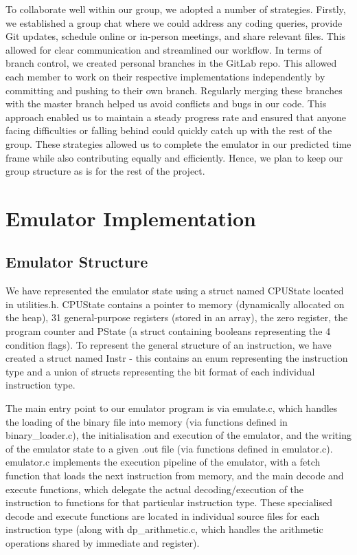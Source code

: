 \documentclass{article}
\begin{document}
To collaborate well within our group, we adopted a number of strategies.
Firstly, we established a group chat where we could address any coding queries,
provide Git updates, schedule online or in-person meetings, and share relevant
files. This allowed for clear communication and streamlined our workflow. In
terms of branch control, we created personal branches in the GitLab repo. This
allowed each member to work on their respective implementations independently by
committing and pushing to their own branch. Regularly merging these branches
with the master branch helped us avoid conflicts and bugs in our code. This
approach enabled us to maintain a steady progress rate and ensured that anyone
facing difficulties or falling behind could quickly catch up with the rest of
the group. These strategies allowed us to complete the emulator in our predicted
time frame while also contributing equally and efficiently. Hence, we plan to
keep our group structure as is for the rest of the project.

\section{Emulator Implementation}

\subsection{Emulator Structure}

We have represented the emulator state using a struct named CPUState located in
utilities.h. CPUState contains a pointer to memory (dynamically allocated on the
heap), 31 general-purpose registers (stored in an array), the zero register, the
program counter and PState (a struct containing booleans representing the 4
condition flags). To represent the general structure of an instruction, we have
created a struct named Instr - this contains an enum representing the
instruction type and a union of structs representing the bit format of each
individual instruction type. 

The main entry point to our emulator program is via emulate.c, which handles the
loading of the binary file into memory (via functions defined in
binary\_loader.c), the initialisation and execution of the emulator, and the
writing of the emulator state to a given .out file (via functions defined in
emulator.c). emulator.c implements the execution pipeline of the emulator, with
a fetch function that loads the next instruction from memory, and the main
decode and execute functions, which delegate the actual decoding/execution of
the instruction to functions for that particular instruction type. These
specialised decode and execute functions are located in individual source files
for each instruction type (along with dp\_arithmetic.c, which handles the
arithmetic operations shared by immediate and register).
\end{document}
